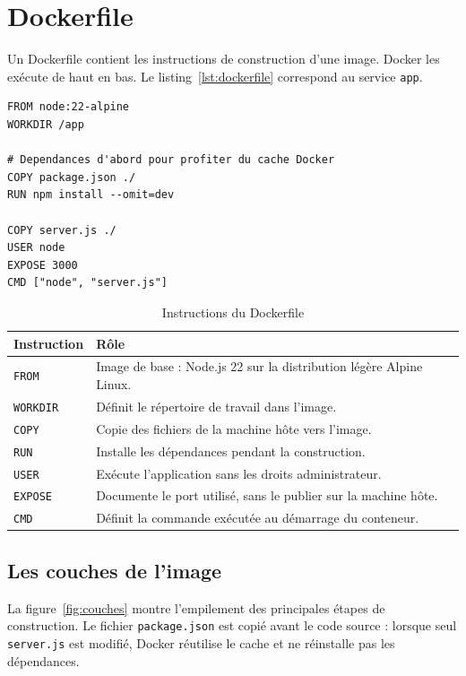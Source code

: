 \documentclass[11pt,a4paper]{article}
\begin{document}
\section{Dockerfile}
Un Dockerfile contient les instructions de construction d'une image. Docker les
exécute de haut en bas. Le listing~\ref{lst:dockerfile} correspond au service
\texttt{app}.

\begin{lstlisting}[caption={Fichier app/Dockerfile}, label={lst:dockerfile}]
FROM node:22-alpine
WORKDIR /app

# Dependances d'abord pour profiter du cache Docker
COPY package.json ./
RUN npm install --omit=dev

COPY server.js ./
USER node
EXPOSE 3000
CMD ["node", "server.js"]
\end{lstlisting}

\begin{table}[H]
\centering
\begin{tabular}{lp{11.5cm}}
\toprule
\textbf{Instruction} & \textbf{Rôle} \\
\midrule
\texttt{FROM}    & Image de base : Node.js 22 sur la distribution légère Alpine Linux. \\
\texttt{WORKDIR} & Définit le répertoire de travail dans l'image. \\
\texttt{COPY}    & Copie des fichiers de la machine hôte vers l'image. \\
\texttt{RUN}     & Installe les dépendances pendant la construction. \\
\texttt{USER}    & Exécute l'application sans les droits administrateur. \\
\texttt{EXPOSE}  & Documente le port utilisé, sans le publier sur la machine hôte. \\
\texttt{CMD}     & Définit la commande exécutée au démarrage du conteneur. \\
\bottomrule
\end{tabular}
\caption{Instructions du Dockerfile}
\end{table}

\subsection{Les couches de l'image}
La figure~\ref{fig:couches} montre l'empilement des principales étapes de
construction. Le fichier \texttt{package.json} est copié avant le code source :
lorsque seul \texttt{server.js} est modifié, Docker réutilise le cache et ne
réinstalle pas les dépendances.
\end{document}
